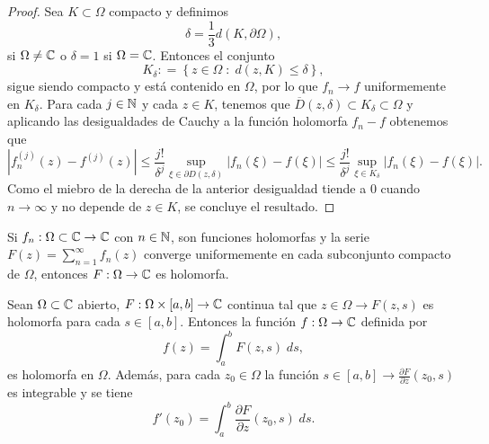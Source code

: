 \begin{proof}
Sea $\displaystyle K \subset \Omega  $ compacto y definimos 
\[\delta = \frac{1}{3}d\left(K, \partial \Omega \right) ,\]
si $\displaystyle \Omega \neq \mathbb{C} $ o $\displaystyle \delta = 1 $ si $\displaystyle \Omega = \mathbb{C} $. Entonces el conjunto
\[K_{\delta }: = \left\{ z \in \Omega \; : \; d\left(z,K\right)\leq \delta \right\}  ,\]
sigue siendo compacto y está contenido en $\displaystyle \Omega  $, por lo que $\displaystyle f_{n} \to f $ uniformemente en $\displaystyle K_{\delta } $. 
Para cada $\displaystyle j \in \mathbb{N} $ y cada $\displaystyle z \in K $, tenemos que $\displaystyle \overline{D}\left(z, \delta \right)\subset K_{\delta }\subset \Omega  $ y aplicando las desigualdades de Cauchy a la función holomorfa $\displaystyle f_{n} -f $ obtenemos que 
\[ \left|f_{n}^{\left(j\right)}\left(z\right)-f^{\left(j\right)}\left(z\right)\right| \leq \frac{j!}{\delta ^{j}}\sup_{\xi\in \partial D\left(z, \delta \right)} \left|f_{n}\left(\xi\right)-f\left(\xi\right)\right| \leq \frac{j!}{\delta ^{j}}\sup_{\xi \in K_{\delta }} \left|f_{n}\left(\xi\right)-f\left(\xi\right)\right| .\]
Como el miebro de la derecha de la anterior desigualdad tiende a $\displaystyle 0 $ cuando $\displaystyle n \to \infty $ y no depende de $\displaystyle z \in K $, se concluye el resultado. 
\end{proof}
\begin{colorary}
Si $\displaystyle f_{n} : \Omega \subset \mathbb{C} \to \mathbb{C} $ con $\displaystyle n \in \mathbb{N} $, son funciones holomorfas y la serie $\displaystyle F\left(z\right)=\sum^{\infty}_{n = 1}f_{n}\left(z\right) $ converge uniformemente en cada subconjunto compacto de $\displaystyle \Omega  $, entonces $\displaystyle F : \Omega \to \mathbb{C} $ es holomorfa.
\end{colorary}
\begin{theorem}
	Sean $\displaystyle \Omega \subset \mathbb{C} $ abierto, $\displaystyle F : \Omega \times \left[a,b\right] \to \mathbb{C} $ continua tal que $\displaystyle z \in \Omega \to F\left(z,s\right) $ es holomorfa para cada $\displaystyle s \in \left[a,b\right]  $. Entonces la función $\displaystyle f :  \Omega\to \mathbb{C} $ definida por
	\[f\left(z\right)=\int^{b}_{a} F\left(z,s\right) \; d s ,\]
	es holomorfa en $\displaystyle \Omega  $. Además, para cada $\displaystyle z_{0} \in \Omega  $ la función $\displaystyle s \in \left[a,b\right] \to \frac{\partial F}{\partial z}\left(z_{0}, s\right) $ es integrable y se tiene 
	\[f'\left(z_{0}\right)=\int^{b}_{a} \frac{\partial F}{\partial z}\left(z_{0}, s\right) \; d s .\]
\end{theorem}
